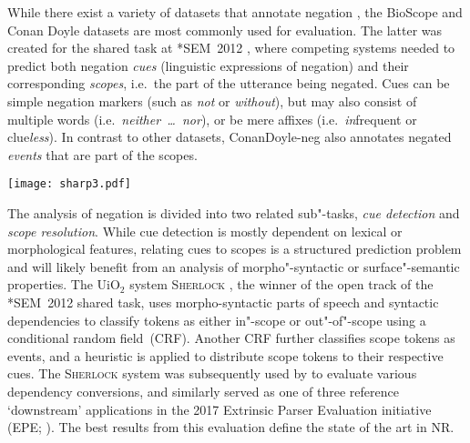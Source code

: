 \documentclass[11pt,a4paper]{article}
\theoremstyle{plain}
\begin{document}
While there exist a variety of datasets that annotate negation
\citep{jimenez-zafra0corpora}, the BioScope
\citep{szarvas2008bioscope} and Conan Doyle datasets
\citep[ConanDoyle-neg; ][]{morante2012conandoyleneg} are most commonly used for evaluation.
The latter was created for the shared task at *SEM~2012
\citep{Mor:Bla:12}, where competing systems needed to predict both
negation \emph{cues} (linguistic expressions of negation) and their
corresponding \emph{scopes}, i.e.\ the part of the utterance being
negated.
Cues can be simple negation markers (such as \textit{not} or \textit{without}), but may also
consist of multiple words (i.e.\ \textit{neither~\dots~nor}), or be
mere affixes (i.e.\ \textit{in}frequent or clue\textit{less}).
In contrast to other datasets, ConanDoyle-neg also annotates
negated \emph{events} that are part of the scopes.

\begin{figure*}
  \centering
  \texttt{[image: sharp3.pdf]}
  \caption{An example of how overlapping ConanDoyle-neg annotations are
  converted to flat sequences of labels in \textsc{Sherlock}.
  In this example, an in-scope token is labelled with \texttt{N}, a cue
  with \texttt{CUE}, a negated event with \texttt{E}, a negation stop
  with \texttt{S}, and an out-of-scope token with \texttt{O}. Illustration taken from \citet{Lap:Oep:Ovr:17}.}
\label{fg:sherlock}
\end{figure*}

The analysis of negation is divided into two related sub"-tasks,
\emph{cue detection} and \emph{scope resolution}.
While cue detection is mostly dependent on lexical or morphological
features, relating cues to scopes is a structured prediction problem and will likely benefit from an analysis of
morpho"-syntactic or surface"-semantic properties.
The UiO$_2$ system \textsc{Sherlock} \citep{Lap:Vel:Ovr:12}, the winner
of the open track of the *SEM~2012 shared task, uses morpho-syntactic parts of speech and syntactic dependencies
to classify tokens as either in"-scope or out"-of"-scope using a conditional
random field~(CRF).
Another CRF further classifies scope tokens as events, and a heuristic
is applied to distribute scope tokens to their respective cues.
The \textsc{Sherlock} system was subsequently used by \citet{elming2013downstream} to
evaluate various dependency conversions, and
similarly served as one of three reference `downstream' applications in the 2017 Extrinsic Parser Evaluation initiative
(EPE; \citealp{Oep:Ovr:Bjo:17}).
The best results from this evaluation define the state of the art in NR.
\end{document}
